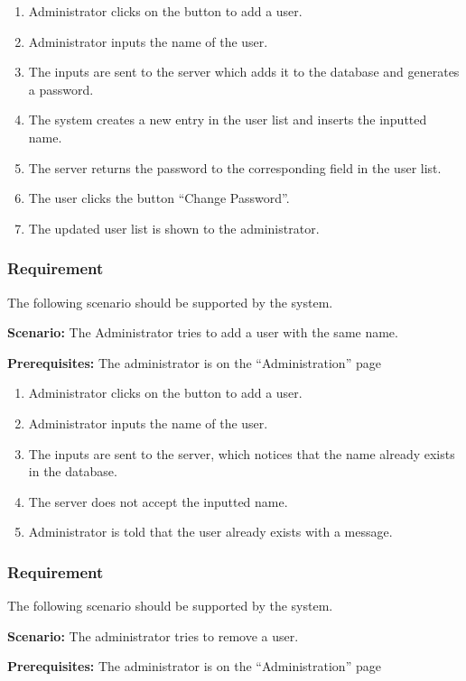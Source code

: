 \documentclass{article}
\begin{document}
\begin{enumerate}
    \item Administrator clicks on the button to add a user.
    \item Administrator inputs the name of the user.
    \item The inputs are sent to the server which adds it to the database and generates a password.
    \item The system creates a new entry in the user list and inserts the inputted name.
    \item The server returns the password to the corresponding field in the user list.
    \item The user clicks the button “Change Password”.
    \item The updated user list is shown to the administrator.
\end{enumerate}

\subsubsection{Requirement}
The following scenario should be supported by the system.

\textbf{Scenario:} The Administrator tries to add a user with the same name.

\textbf{Prerequisites:} The administrator is on the “Administration” page

\begin{enumerate}
    \item Administrator clicks on the button to add a user.
    \item Administrator inputs the name of the user.
    \item The inputs are sent to the server, which notices that the name already exists in the database.
    \item The server does not accept the inputted name.
    \item Administrator is told that the user already exists with a message.
\end{enumerate}

\subsubsection{Requirement}
The following scenario should be supported by the system.

\textbf{Scenario:} The administrator tries to remove a user.

\textbf{Prerequisites:} The administrator is on the “Administration” page
\end{document}
